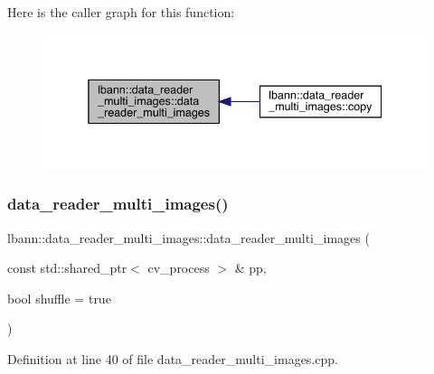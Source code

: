Here is the caller graph for this function\+:\nopagebreak
\begin{figure}[H]
\begin{center}
\leavevmode
\includegraphics[width=338pt]{classlbann_1_1data__reader__multi__images_a91725ae909007b26410837257aa921dc_icgraph}
\end{center}
\end{figure}
\mbox{\label{classlbann_1_1data__reader__multi__images_a2aa9155e574084985bf3b1bd3663d1c5}} 
\subsubsection{\texorpdfstring{data\+\_\+reader\+\_\+multi\+\_\+images()}{data\_reader\_multi\_images()}\hspace{0.1cm}{\footnotesize\ttfamily [2/3]}}
{\footnotesize\ttfamily lbann\+::data\+\_\+reader\+\_\+multi\+\_\+images\+::data\+\_\+reader\+\_\+multi\+\_\+images (\begin{DoxyParamCaption}\item[{const std\+::shared\+\_\+ptr$<$ cv\+\_\+process $>$ \&}]{pp,  }\item[{bool}]{shuffle = {\ttfamily true} }\end{DoxyParamCaption})}



Definition at line 40 of file data\+\_\+reader\+\_\+multi\+\_\+images.\+cpp.


